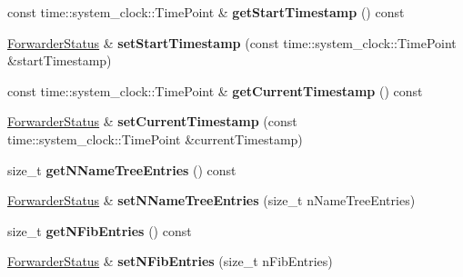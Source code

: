 \begin{DoxyCompactItemize}
\item 
const time\+::system\+\_\+clock\+::\+Time\+Point \& {\bfseries get\+Start\+Timestamp} () const\hypertarget{classndn_1_1nfd_1_1ForwarderStatus_a4f42518ad11e445f5f4118b77e1826a5}{}\label{classndn_1_1nfd_1_1ForwarderStatus_a4f42518ad11e445f5f4118b77e1826a5}

\item 
\hyperlink{classndn_1_1nfd_1_1ForwarderStatus}{Forwarder\+Status} \& {\bfseries set\+Start\+Timestamp} (const time\+::system\+\_\+clock\+::\+Time\+Point \&start\+Timestamp)\hypertarget{classndn_1_1nfd_1_1ForwarderStatus_aaf02e527b16c962bd3af2ba9b9b1b485}{}\label{classndn_1_1nfd_1_1ForwarderStatus_aaf02e527b16c962bd3af2ba9b9b1b485}

\item 
const time\+::system\+\_\+clock\+::\+Time\+Point \& {\bfseries get\+Current\+Timestamp} () const\hypertarget{classndn_1_1nfd_1_1ForwarderStatus_aec3a32a66b8b4d49dc6749624b601bdf}{}\label{classndn_1_1nfd_1_1ForwarderStatus_aec3a32a66b8b4d49dc6749624b601bdf}

\item 
\hyperlink{classndn_1_1nfd_1_1ForwarderStatus}{Forwarder\+Status} \& {\bfseries set\+Current\+Timestamp} (const time\+::system\+\_\+clock\+::\+Time\+Point \&current\+Timestamp)\hypertarget{classndn_1_1nfd_1_1ForwarderStatus_a1d1627d02bb2035f04795ad81803d7da}{}\label{classndn_1_1nfd_1_1ForwarderStatus_a1d1627d02bb2035f04795ad81803d7da}

\item 
size\+\_\+t {\bfseries get\+N\+Name\+Tree\+Entries} () const\hypertarget{classndn_1_1nfd_1_1ForwarderStatus_aacaca2baf33f36816e146323f9e02c60}{}\label{classndn_1_1nfd_1_1ForwarderStatus_aacaca2baf33f36816e146323f9e02c60}

\item 
\hyperlink{classndn_1_1nfd_1_1ForwarderStatus}{Forwarder\+Status} \& {\bfseries set\+N\+Name\+Tree\+Entries} (size\+\_\+t n\+Name\+Tree\+Entries)\hypertarget{classndn_1_1nfd_1_1ForwarderStatus_a35ecb81dcc8ada7fcbf78ea5ee8e37fc}{}\label{classndn_1_1nfd_1_1ForwarderStatus_a35ecb81dcc8ada7fcbf78ea5ee8e37fc}

\item 
size\+\_\+t {\bfseries get\+N\+Fib\+Entries} () const\hypertarget{classndn_1_1nfd_1_1ForwarderStatus_a55b4d7955c3c1a4f516df159da1cc0f0}{}\label{classndn_1_1nfd_1_1ForwarderStatus_a55b4d7955c3c1a4f516df159da1cc0f0}

\item 
\hyperlink{classndn_1_1nfd_1_1ForwarderStatus}{Forwarder\+Status} \& {\bfseries set\+N\+Fib\+Entries} (size\+\_\+t n\+Fib\+Entries)\hypertarget{classndn_1_1nfd_1_1ForwarderStatus_adbc53565db484c43e0146ac99957a471}{}\label{classndn_1_1nfd_1_1ForwarderStatus_adbc53565db484c43e0146ac99957a471}


\end{DoxyCompactItemize}
